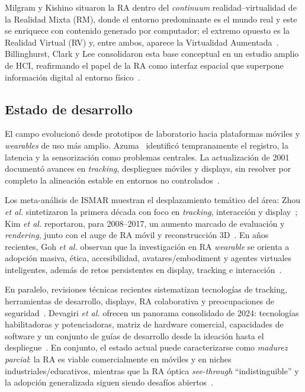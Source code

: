 \documentclass[conference]{IEEEtran}
\begin{document}
Milgram y Kishino situaron la RA dentro del \emph{continuum} realidad--virtualidad de la Realidad Mixta (RM), donde el entorno predominante es el mundo real y este se enriquece con contenido generado por computador; el extremo opuesto es la Realidad Virtual (RV) y, entre ambos, aparece la Virtualidad Aumentada~\cite{milgram1994taxonomy}. Billinghurst, Clark y Lee consolidaron esta base conceptual en un estudio amplio de HCI, reafirmando el papel de la RA como interfaz espacial que superpone informaci\'on digital al entorno f\'isico~\cite{billinghurst2015survey}.

\subsection{Estado de desarrollo}
El campo evolucion\'o desde prototipos de laboratorio hacia plataformas m\'oviles y \emph{wearables} de uso m\'as amplio. Azuma~\cite{azuma1997survey} identific\'o tempranamente el registro, la latencia y la sensorizaci\'on como problemas centrales. La actualizaci\'on de 2001 document\'o avances en \emph{tracking}, despliegues m\'oviles y displays, sin resolver por completo la alineaci\'on estable en entornos no controlados~\cite{azuma2001recent}.

Los meta-an\'alisis de ISMAR muestran el desplazamiento tem\'atico del \'area: Zhou \textit{et al.} sintetizaron la primera d\'ecada con foco en \emph{tracking}, interacci\'on y display~\cite{zhou2008trends}; Kim \textit{et al.} reportaron, para 2008--2017, un aumento marcado de evaluaci\'on y \emph{rendering}, junto con el auge de RA m\'ovil y reconstrucci\'on 3D~\cite{kim2018revisiting}. En a\~nos recientes, Goh \textit{et al.} observan que la investigaci\'on en RA \emph{wearable} se orienta a adopci\'on masiva, \'etica, accesibilidad, avatares/embodiment y agentes virtuales inteligentes, adem\'as de retos persistentes en display, tracking e interacci\'on~\cite{goh2023wearable}.

En paralelo, revisiones t\'ecnicas recientes sistematizan tecnolog\'ias de tracking, herramientas de desarrollo, displays, RA colaborativa y preocupaciones de seguridad~\cite{syed2023indepth}. Devagiri \textit{et al.} ofrecen un panorama consolidado de 2024: tecnolog\'ias habilitadoras y potenciadoras, matriz de hardware comercial, capacidades de software y un conjunto de gu\'ias de desarrollo desde la ideaci\'on hasta el despliegue~\cite{devagiri2024essentials}. En conjunto, el estado actual puede caracterizarse como \emph{madurez parcial}: la RA es viable comercialmente en m\'oviles y en niches industriales/educativos, mientras que la RA óptica \emph{see-through} ``indistinguible'' y la adopci\'on generalizada siguen siendo desaf\'ios abiertos~\cite{goh2023wearable,devagiri2024essentials}.
\end{document}
